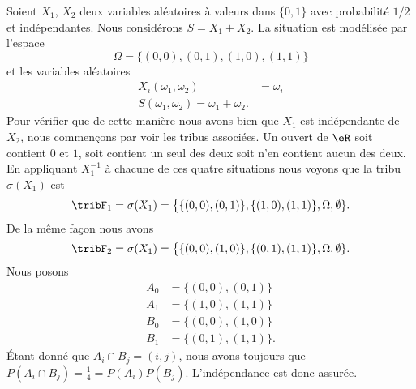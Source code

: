 \begin{example}
    Soient \( X_1\), \( X_2\) deux variables aléatoires à valeurs dans \( \{ 0,1 \}\) avec probabilité \( 1/2\) et indépendantes. Nous considérons \( S=X_1+X_2\). La situation est modélisée par l'espace
    \begin{equation}
        \Omega=\{ (0,0),(0,1),(1,0),(1,1) \}
    \end{equation}
    et les variables aléatoires
    \begin{subequations}
        \begin{align}
            X_i(\omega_1,\omega_2)&=\omega_{i}\\
            S(\omega_1,\omega_2)=\omega_1+\omega_2.
        \end{align}
    \end{subequations}
    Pour vérifier que de cette manière nous avons bien que \( X_1\) est indépendante de \( X_2\), nous commençons par voir les tribus associées. Un ouvert de \( \eR\) soit contient \( 0\) et \( 1\), soit contient un seul des deux soit n'en contient aucun des deux. En appliquant \( X_1^{-1}\) à chacune de ces quatre situations nous voyons que la tribu \( \sigma(X_1)\) est
    \begin{equation}
        \tribF_1=\sigma(X_1)=\big\{ \{ (0,0),(0,1) \},\{ (1,0),(1,1) \},\Omega,\emptyset \}.
    \end{equation}
    De la même façon nous avons
    \begin{equation}
        \tribF_2=\sigma(X_1)=\big\{ \{ (0,0),(1,0) \},\{ (0,1),(1,1) \},\Omega,\emptyset \}.
    \end{equation}
    Nous posons
    \begin{subequations}
        \begin{align}
            A_0&=\{ (0,0),(0,1) \}\\
            A_1&=\{ (1,0),(1,1) \}\\
            B_0&=\{ (0,0),(1,0) \}\\
            B_1&=\{ (0,1),(1,1) \}.
        \end{align}
    \end{subequations}
    Étant donné que \( A_i\cap B_j=(i,j)\), nous avons toujours que \( P(A_i\cap B_j)=\frac{1}{ 4 }=P(A_i)P(B_j)\). L'indépendance est donc assurée.


\end{example}
